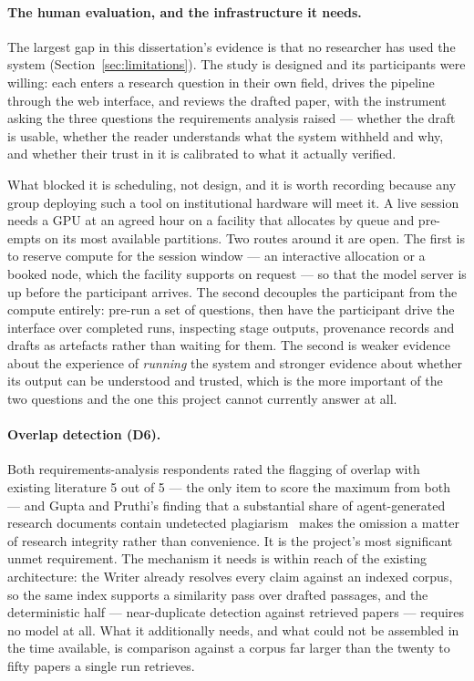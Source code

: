 \paragraph{The human evaluation, and the infrastructure it needs.} The largest gap
in this dissertation's evidence is that no researcher has used the system
(Section~\ref{sec:limitations}). The study is designed and its participants were
willing: each enters a research question in their own field, drives the pipeline
through the web interface, and reviews the drafted paper, with the instrument asking
the three questions the requirements analysis raised --- whether the draft is usable,
whether the reader understands what the system withheld and why, and whether their
trust in it is calibrated to what it actually verified.

What blocked it is scheduling, not design, and it is worth recording because any
group deploying such a tool on institutional hardware will meet it. A live session
needs a GPU at an agreed hour on a facility that allocates by queue and pre-empts on
its most available partitions. Two routes around it are open. The first is to
reserve compute for the session window --- an interactive allocation or a booked
node, which the facility supports on request --- so that the model server is up
before the participant arrives. The second decouples the participant from the
compute entirely: pre-run a set of questions, then have the participant drive the
interface over completed runs, inspecting stage outputs, provenance records and
drafts as artefacts rather than waiting for them. The second is weaker evidence about
the experience of \emph{running} the system and stronger evidence about whether its
output can be understood and trusted, which is the more important of the two
questions and the one this project cannot currently answer at all.

\paragraph{Overlap detection (D6).} Both requirements-analysis respondents rated
the flagging of overlap with existing literature 5 out of 5 --- the only item to
score the maximum from both --- and Gupta and Pruthi's finding that a substantial
share of agent-generated research documents contain undetected
plagiarism~\cite{gupta2025glitters} makes the omission a matter of research
integrity rather than convenience. It is the project's most significant unmet
requirement. The mechanism it needs is within reach of the existing architecture:
the Writer already resolves every claim against an indexed corpus, so the same
index supports a similarity pass over drafted passages, and the deterministic
half --- near-duplicate detection against retrieved papers --- requires no model at
all. What it additionally needs, and what could not be assembled in the time
available, is comparison against a corpus far larger than the twenty to fifty
papers a single run retrieves.

